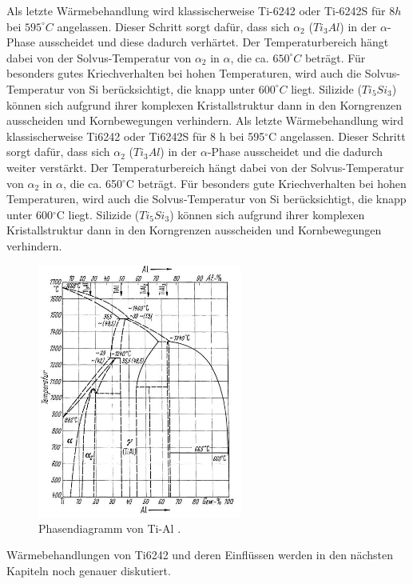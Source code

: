 Als letzte Wärmebehandlung wird klassischerweise  Ti-6242 oder Ti-6242S für  $8 h$ bei $595^\circ C$ angelassen. Dieser Schritt sorgt dafür, dass sich $\alpha_2$ ($Ti_3Al$) in der $\alpha$-Phase ausscheidet und diese dadurch verhärtet. Der Temperaturbereich hängt dabei von der Solvus-Temperatur von $\alpha_2$ in $\alpha$, die ca. $650^\circ C$ beträgt.\cite{Lutjering.2007}
Für besonders gutes Kriechverhalten bei hohen Temperaturen, wird auch die Solvus-Temperatur von Si berücksichtigt, die knapp unter $600^\circ C$ liegt. Silizide ($Ti_5Si_3$) können sich aufgrund ihrer komplexen Kristallstruktur dann in den Korngrenzen ausscheiden und Kornbewegungen verhindern.
Als letzte Wärmebehandlung wird klassischerweise  Ti6242 oder Ti6242S für  8 h bei 595$^\circ$C angelassen. Dieser Schritt sorgt dafür, dass sich $\alpha_2$ ($Ti_3Al$) in der $\alpha$-Phase ausscheidet und die dadurch weiter verstärkt. Der Temperaturbereich hängt dabei von der Solvus-Temperatur von $\alpha_2$ in $\alpha$, die ca. 650$^\circ$C beträgt.\cite{Lutjering.2007}
Für besonders gute Kriechverhalten bei hohen Temperaturen, wird auch die Solvus-Temperatur von Si berücksichtigt, die knapp unter 600$^\circ$C liegt. Silizide ($Ti_5Si_3$) können sich aufgrund ihrer komplexen Kristallstruktur dann in den Korngrenzen ausscheiden und Kornbewegungen verhindern.


\begin{figure}[H]
	\centering
	\includegraphics[width=0.6\textwidth]{Bilder/TiAl}
	\caption{Phasendiagramm von Ti-Al . \cite{Zwicker.2014}}
	\label{fig:PD_tial}
\end{figure}

Wärmebehandlungen von Ti6242 und deren Einflüssen werden in den nächsten Kapiteln noch genauer diskutiert.


